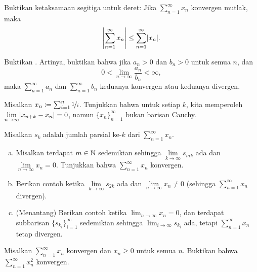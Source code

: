\begin{exercise}
Buktikan ketaksamaan segitiga untuk deret:
Jika $\sum_{n=1}^\infty x_n$ konvergen mutlak, maka
\begin{equation*}
\left\lvert {\sum_{n=1}^\infty x_n} \right\rvert \leq
\sum_{n=1}^\infty \lvert {x_n} \rvert .
\end{equation*}
\end{exercise}

\begin{exercise}
Buktikan \emph{}.  Artinya, buktikan bahwa jika
$a_n > 0$ dan $b_n > 0$ untuk semua $n$, dan
\begin{equation*}
0 < \lim_{n\to\infty} \frac{a_n}{b_n} < \infty ,
\end{equation*}
maka $\sum_{n=1}^\infty a_n$ dan $\sum_{n=1}^\infty b_n$ keduanya konvergen atau keduanya divergen.
\end{exercise}

\begin{exercise} \label{exercise:badnocauchy}
Misalkan $x_n \coloneqq \sum_{i=1}^n \nicefrac{1}{i}$.  Tunjukkan bahwa untuk setiap $k$,
kita memperoleh
$\displaystyle \lim_{n\to\infty} \lvert {x_{n+k}-x_n} \rvert = 0$, namun
$\{ x_n \}_{n=1}^\infty$ bukan barisan Cauchy.
\end{exercise}

\begin{samepage}
\begin{exercise}
Misalkan $s_k$ adalah jumlah parsial ke-$k$ dari $\sum_{n=1}^\infty x_n$.
\begin{enumerate}[a)]
\item
Misalkan terdapat $m \in {\mathbb{N}}$ sedemikian sehingga $\lim\limits_{k\to\infty}
s_{mk}$ ada dan $\lim\limits_{n\to\infty} x_n = 0$.  Tunjukkan bahwa
$\sum_{n=1}^\infty x_n$ konvergen.
\item
Berikan contoh ketika $\lim\limits_{k\to\infty} s_{2k}$ ada dan
$\lim\limits_{n\to\infty} x_n \neq 0$ (sehingga $\sum_{n=1}^\infty x_n$ divergen).
\item
(Menantang) Berikan contoh ketika $\lim_{n\to\infty} x_n = 0$, dan terdapat
subbarisan $\{ s_{k_i} \}_{i=1}^\infty$ sedemikian sehingga $\displaystyle \lim_{i\to\infty} s_{k_i}$ ada,
tetapi $\sum_{n=1}^\infty x_n$ tetap divergen.
\end{enumerate}
\end{exercise}
\end{samepage}

\begin{exercise} \label{exercise:squareseriesconv}
Misalkan $\sum_{n=1}^\infty x_n$ konvergen dan $x_n \geq 0$ untuk semua $n$.
Buktikan bahwa $\sum_{n=1}^\infty x_n^2$ konvergen.
\end{exercise}

